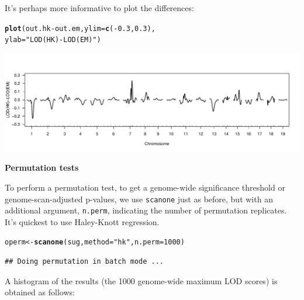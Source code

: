 \documentclass[12pt]{article}\usepackage[]{graphicx}\usepackage[]{color}
\makeatletter
\def\maxwidth{ %
  \ifdim\Gin@nat@width>\linewidth
    \linewidth
  \else
    \Gin@nat@width
  \fi
}
\newcommand{\hlnum}[1]{\textcolor[rgb]{0.686,0.059,0.569}{#1}}%
\newcommand{\hlstr}[1]{\textcolor[rgb]{0.192,0.494,0.8}{#1}}%
\newcommand{\hlopt}[1]{\textcolor[rgb]{0,0,0}{#1}}%
\newcommand{\hlstd}[1]{\textcolor[rgb]{0.345,0.345,0.345}{#1}}%
\newcommand{\hlkwb}[1]{\textcolor[rgb]{0.69,0.353,0.396}{#1}}%
\newcommand{\hlkwc}[1]{\textcolor[rgb]{0.333,0.667,0.333}{#1}}%
\newcommand{\hlkwd}[1]{\textcolor[rgb]{0.737,0.353,0.396}{\textbf{#1}}}%
\newenvironment{kframe}{%
 \def\at@end@of@kframe{}%
 \ifinner\ifhmode%
  \def\at@end@of@kframe{\end{minipage}}%
  \begin{minipage}{\columnwidth}%
 \fi\fi%
 \def\FrameCommand##1{\hskip\@totalleftmargin \hskip-\fboxsep
 \colorbox{shadecolor}{##1}\hskip-\fboxsep
     \hskip-\linewidth \hskip-\@totalleftmargin \hskip\columnwidth}%
 \MakeFramed {\advance\hsize-\width
   \@totalleftmargin\z@ \linewidth\hsize
   \@setminipage}}%
 {\par\unskip\endMakeFramed%
 \at@end@of@kframe}
\newenvironment{knitrout}{}{} %
\makeatother
\begin{document}
It's perhaps more informative to plot the differences:

\begin{knitrout}
\color{fgcolor}\begin{kframe}
\begin{alltt}
\hlkwd{plot}\hlstd{(out.hk} \hlopt{-} \hlstd{out.em,} \hlkwc{ylim}\hlstd{=}\hlkwd{c}\hlstd{(}\hlopt{-}\hlnum{0.3}\hlstd{,} \hlnum{0.3}\hlstd{),}
     \hlkwc{ylab}\hlstd{=}\hlstr{"LOD(HK)-LOD(EM)"}\hlstd{)}
\end{alltt}
\end{kframe}
\includegraphics[width=\maxwidth]{RnwFigs/plot_diff-1} 

\end{knitrout}

\bigskip
{\sffamily \textbf{Permutation tests}}
\nopagebreak

To perform a permutation test, to get a genome-wide significance
threshold or genome-scan-adjusted p-values, we use {\tt scanone} just as
before, but with an additional argument, {\tt n.perm}, indicating the
number of permutation replicates.  It's quickest to use Haley-Knott
regression.

\begin{knitrout}
\color{fgcolor}\begin{kframe}
\begin{alltt}
\hlstd{operm} \hlkwb{<-} \hlkwd{scanone}\hlstd{(sug,} \hlkwc{method}\hlstd{=}\hlstr{"hk"}\hlstd{,} \hlkwc{n.perm}\hlstd{=}\hlnum{1000}\hlstd{)}
\end{alltt}
\begin{verbatim}
## Doing permutation in batch mode ...
\end{verbatim}
\end{kframe}
\end{knitrout}

A histogram of the results (the 1000 genome-wide maximum LOD
scores) is obtained as follows:
\end{document}
